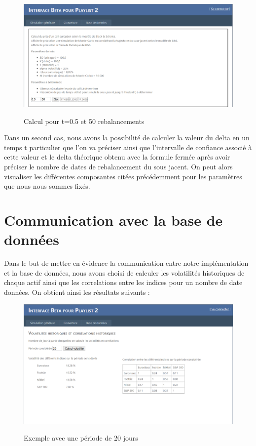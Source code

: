 \documentclass[french,12pt,a4paper]{article}
\begin{document}
\begin{center}
\begin{figure}[h!]
    \caption{Calcul pour t=0.5 et 50 rebalancements}
    \includegraphics[scale=0.45]{../test1.png}
    \label{fig:PropProf}
\end{figure}
\end{center} 

\indent Dans un second cas, nous avons la possibilité de calculer la valeur du delta en un temps t particulier que l'on va préciser ainsi que l'intervalle de confiance associé à cette valeur et le delta théorique obtenu avec la formule fermée après avoir préciser le nombre de dates de rebalancement du sous jacent. On peut alors visualiser les différentes composantes citées précédemment pour les paramètres que nous nous sommes fixés.

\section{Communication avec la base de données}

Dans le but de mettre en évidence la communication entre notre implémentation et la base de données, nous avons choisi de calculer les volatilités historiques de chaque actif ainsi que les correlations entre les indices pour un nombre de date données. On obtient ainsi les résultats suivants :

\begin{center}
\begin{figure}[h!]
    \caption{Exemple avec une période de 20 jours}
    \includegraphics[scale=0.45]{Manuel2.png}
    \label{fig:PropProf}
\end{figure}
\end{center} 
\end{document}
